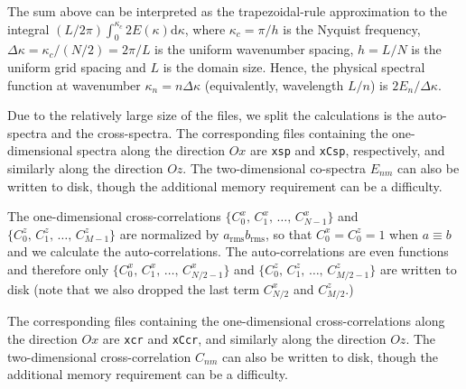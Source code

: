 The sum above can be interpreted as the trapezoidal-rule approximation to the
integral $(L/2\pi)\int_0^{\kappa_c}2E(\kappa)\mathrm{d}\kappa$, where
$\kappa_c=\pi/h$ is the Nyquist frequency, $\Delta \kappa=\kappa_c/(N/2)=2\pi/L$
is the uniform wavenumber spacing, $h=L/N$ is the uniform grid spacing and $L$
is the domain size. Hence, the physical spectral function at wavenumber $\kappa_n=
n\Delta \kappa$ (equivalently, wavelength $L/n$) is $2E_n/\Delta \kappa$.

Due to the relatively large size of the files, we split the calculations is the
auto-spectra and the cross-spectra. The corresponding files containing the
one-dimensional spectra along the direction $Ox$ are {\tt xsp} and {\tt xCsp},
respectively, and similarly along the direction $Oz$. The two-dimensional
co-spectra $E_{nm}$ can also be written to disk, though the additional memory
requirement can be a difficulty.

The one-dimensional cross-correlations $\{C^x_0,\,C^x_1,\,\ldots,\,C^x_{N-1}\}$
and $\{C^z_0,\,C^z_1,\,\ldots,\,C^z_{M-1}\}$ are normalized by
$a_\mathrm{rms}b_\mathrm{rms}$, so that $C^x_0 = C^z_0 =1$ when $a\equiv b$ and
we calculate the auto-correlations. The auto-correlations are even functions and
therefore only $\{C^x_0,\,C^x_1,\,\ldots,\,C^x_{N/2-1}\}$ and
$\{C^z_0,\,C^z_1,\,\ldots,\,C^z_{M/2-1}\}$ are written to disk (note that we
also dropped the last term $C^x_{N/2}$ and $C^z_{M/2}$.)

The corresponding files containing the one-dimensional cross-correlations along
the direction $Ox$ are {\tt xcr} and {\tt xCcr}, and similarly along the
direction $Oz$. The two-dimensional cross-correlation $C_{nm}$ can also be
written to disk, though the additional memory requirement can be a difficulty.

